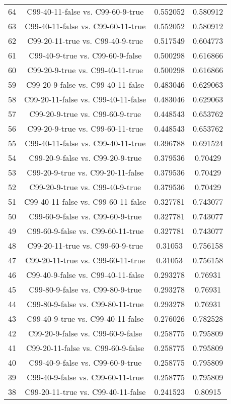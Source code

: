 \documentclass[a4paper,10pt]{article}
\begin{document}
\begin{landscape}
\begin{table}[!htp]
\begin{tabular}{cccc}
64&C99-40-11-false vs. C99-60-9-true&0.552052&0.580912\\
63&C99-40-11-false vs. C99-60-11-true&0.552052&0.580912\\
62&C99-20-11-true vs. C99-40-9-true&0.517549&0.604773\\
61&C99-40-9-true vs. C99-60-9-false&0.500298&0.616866\\
60&C99-20-9-true vs. C99-40-11-true&0.500298&0.616866\\
59&C99-20-9-false vs. C99-40-11-false&0.483046&0.629063\\
58&C99-20-11-false vs. C99-40-11-false&0.483046&0.629063\\
57&C99-20-9-true vs. C99-60-9-true&0.448543&0.653762\\
56&C99-20-9-true vs. C99-60-11-true&0.448543&0.653762\\
55&C99-40-11-false vs. C99-40-11-true&0.396788&0.691524\\
54&C99-20-9-false vs. C99-20-9-true&0.379536&0.70429\\
53&C99-20-9-true vs. C99-20-11-false&0.379536&0.70429\\
52&C99-20-9-true vs. C99-40-9-true&0.379536&0.70429\\
51&C99-40-11-false vs. C99-60-11-false&0.327781&0.743077\\
50&C99-60-9-false vs. C99-60-9-true&0.327781&0.743077\\
49&C99-60-9-false vs. C99-60-11-true&0.327781&0.743077\\
48&C99-20-11-true vs. C99-60-9-true&0.31053&0.756158\\
47&C99-20-11-true vs. C99-60-11-true&0.31053&0.756158\\
46&C99-40-9-false vs. C99-40-11-false&0.293278&0.76931\\
45&C99-80-9-false vs. C99-80-9-true&0.293278&0.76931\\
44&C99-80-9-false vs. C99-80-11-true&0.293278&0.76931\\
43&C99-40-9-true vs. C99-40-11-false&0.276026&0.782528\\
42&C99-20-9-false vs. C99-60-9-false&0.258775&0.795809\\
41&C99-20-11-false vs. C99-60-9-false&0.258775&0.795809\\
40&C99-40-9-false vs. C99-60-9-true&0.258775&0.795809\\
39&C99-40-9-false vs. C99-60-11-true&0.258775&0.795809\\
38&C99-20-11-true vs. C99-40-11-false&0.241523&0.80915\\

\end{tabular}
\end{table}
\end{landscape}
\end{document}
